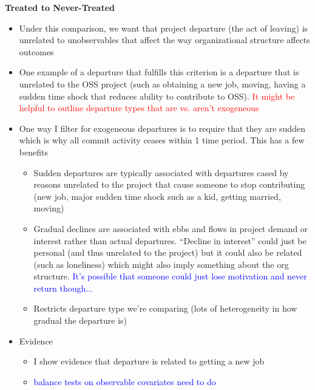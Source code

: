\documentclass[source/paper/main.tex]{subfiles}
\begin{document}
\textbf{Treated to Never-Treated}
\begin{itemize}
    \item Under this comparison, we want that project departure (the act of leaving) is unrelated to unobservables that affect the way organizational structure affects outcomes
    \item One example of a departure that fulfills this criterion is a departure that is unrelated to the OSS project (such as obtaining a new job, moving, having a sudden time shock that reduces ability to contribute to OSS). \textcolor{red}{It might be helpful to outline departure types that are vs. aren't exogeneous}
    \item One way I filter for exogeneous departures is to require that they are sudden which is why all commit activity ceases within 1 time period. This has a few benefits
    \begin{itemize}
        \item Sudden departures are typically associated with departures cased by reasons unrelated to the project that cause someone to stop contributing (new job, major sudden time shock such as a kid, getting married, moving)
        \item Gradual declines are associated with ebbs and flows in project demand or interest rather than actual departures. “Decline in interest” could just be personal (and thus unrelated to the project) but it could also be related (such as loneliness) which might also imply something about the org structure. \textcolor{blue}{It's possible that someone could just lose motivation and never return though...}
        \item Restricts departure type we're comparing (lots of heterogeneity in how gradual the departure is)
    \end{itemize}
    \item Evidence
    \begin{itemize}
        \item I show evidence that departure is related to getting a new job
        \item \textcolor{blue}{balance tests on observable covariates need to do}
    \end{itemize}
\end{itemize}
\end{document}
